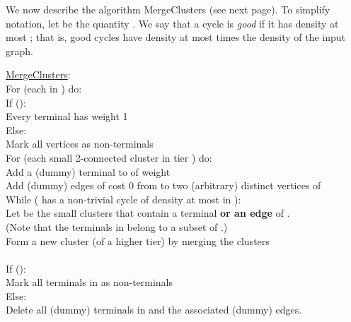 \documentclass[11pt]{article}
\begin{document}
We now describe the algorithm {\sc MergeClusters} (see next page). To simplify
notation, let  be the quantity .  We say
that a cycle is \emph{good} if it has density at most ; that
is, good cycles have density at most  times the density of
the input graph.

\begin{algo}
\underline{\sc MergeClusters}:\\
For (each  in ) do: \+ \\
    If (): \+ \\
        Every terminal has weight 1 \- \\
    Else: \+ \\
        Mark all vertices as non-terminals \\
        For (each small 2-connected cluster  in tier ) do: \+ \\
             Add a (dummy) terminal  to  of weight  \\
             Add (dummy) edges of cost 0 from  to two (arbitrary) distinct vertices of  \- \- \\

    While ( has a non-trivial cycle  of density at most  in ): \+ \\
        Let  be the small clusters that contain a terminal
           {\bf or an edge} of .\\
        (Note that the terminals in  belong to a subset of .)\\
        Form a new cluster  (of a higher tier) by merging the clusters \\
         \\
        If (): \+ \\
            Mark all terminals in  as non-terminals \- \\
        Else: \+ \\
            Delete all (dummy) terminals in  and the associated (dummy) edges.
\end{algo}
\end{document}
